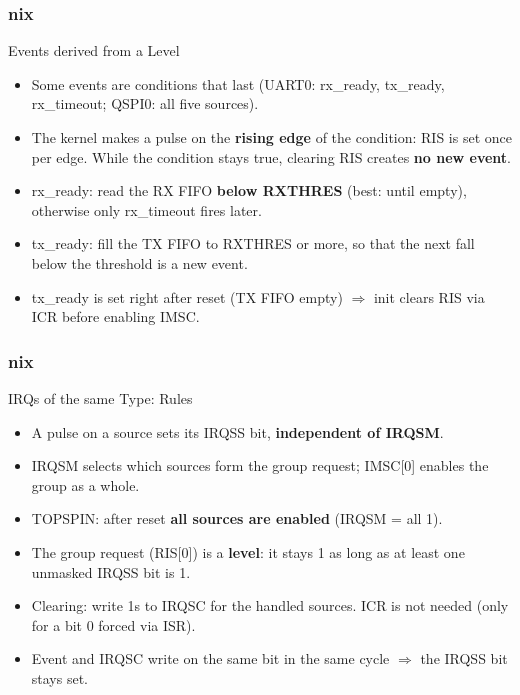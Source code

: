 \documentclass{beamer}
\newcommand{\astitle}{nix}
\newcommand{\assubtitle}{nix}
\begin{document}
\renewcommand{\assubtitle}{Events derived from a Level}
\begin{frame}
\frametitle{\astitle}
\begin{block}{\assubtitle}
  \begin{itemize}
    \item Some events are conditions that last (UART0: rx\_ready, tx\_ready,
      rx\_timeout; QSPI0: all five sources).
    \item The kernel makes a pulse on the \textbf{rising edge} of the condition:
      RIS is set once per edge. While the condition stays true, clearing RIS
      creates \textbf{no new event}.
    \item rx\_ready: read the RX FIFO \textbf{below RXTHRES} (best: until empty),
      otherwise only rx\_timeout fires later.
    \item tx\_ready: fill the TX FIFO to RXTHRES or more, so that the next
      fall below the threshold is a new event.
    \item tx\_ready is set right after reset (TX FIFO empty)
      $\Rightarrow$ init clears RIS via ICR before enabling IMSC.
  \end{itemize}
\end{block}
\end{frame}

\renewcommand{\assubtitle}{IRQs of the same Type: Rules}
\begin{frame}
\frametitle{\astitle}
\begin{block}{\assubtitle}
  \begin{itemize}
    \item A pulse on a source sets its IRQSS bit, \textbf{independent of IRQSM}.
    \item IRQSM selects which sources form the group request;
      IMSC[0] enables the group as a whole.
    \item TOPSPIN: after reset \textbf{all sources are enabled} (IRQSM = all 1).
    \item The group request (RIS[0]) is a \textbf{level}: it stays 1 as long as at
      least one unmasked IRQSS bit is 1.
    \item Clearing: write 1s to IRQSC for the handled sources. ICR is not needed
      (only for a bit 0 forced via ISR).
    \item Event and IRQSC write on the same bit in the same cycle
      $\Rightarrow$ the IRQSS bit stays set.
  \end{itemize}
\end{block}
\end{frame}
\end{document}

